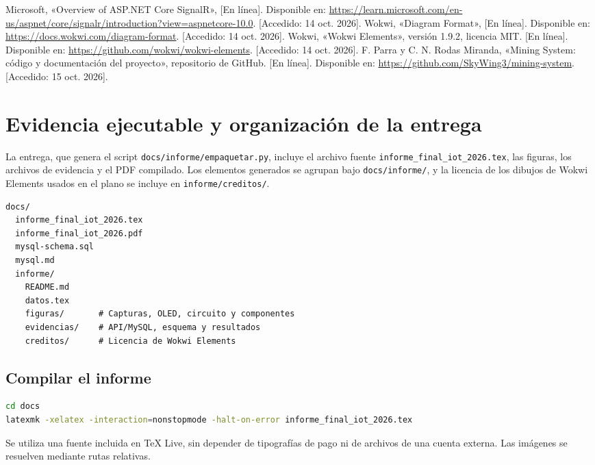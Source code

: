 \documentclass[10pt,a4paper]{article}
\newcommand{\code}[1]{{\small\urlstyle{tt}\nolinkurl{#1}}}
\newcommand{\newsection}[1]{\clearpage\section{#1}}
\begin{document}
\begin{thebibliography}{99}
 Microsoft, «Overview of ASP.NET Core SignalR», [En línea]. Disponible en: \url{https://learn.microsoft.com/en-us/aspnet/core/signalr/introduction?view=aspnetcore-10.0}. [Accedido: 14 oct. 2026].
 Wokwi, «Diagram Format», [En línea]. Disponible en: \url{https://docs.wokwi.com/diagram-format}. [Accedido: 14 oct. 2026].
 Wokwi, «Wokwi Elements», versión 1.9.2, licencia MIT. [En línea]. Disponible en: \url{https://github.com/wokwi/wokwi-elements}. [Accedido: 14 oct. 2026].
 F. Parra y C. N. Rodas Miranda, «Mining System: código y documentación del proyecto», repositorio de GitHub. [En línea]. Disponible en: \url{https://github.com/SkyWing3/mining-system}. [Accedido: 15 oct. 2026].
\end{thebibliography}

\appendix
\newsection{Evidencia ejecutable y organización de la entrega}
La entrega, que genera el script \code{docs/informe/empaquetar.py}, incluye el archivo fuente \code{informe_final_iot_2026.tex}, las figuras, los archivos de evidencia y el PDF compilado. Los elementos generados se agrupan bajo \code{docs/informe/}, y la licencia de los dibujos de Wokwi Elements usados en el plano se incluye en \code{informe/creditos/}.

\begin{lstlisting}
docs/
  informe_final_iot_2026.tex
  informe_final_iot_2026.pdf
  mysql-schema.sql
  mysql.md
  informe/
    README.md
    datos.tex
    figuras/       # Capturas, OLED, circuito y componentes
    evidencias/    # API/MySQL, esquema y resultados
    creditos/      # Licencia de Wokwi Elements
\end{lstlisting}

\subsection*{Compilar el informe}
\begin{lstlisting}[language=bash]
cd docs
latexmk -xelatex -interaction=nonstopmode -halt-on-error informe_final_iot_2026.tex
\end{lstlisting}
Se utiliza una fuente incluida en TeX Live, sin depender de tipografías de pago ni de archivos de una cuenta externa. Las imágenes se resuelven mediante rutas relativas.
\end{document}
